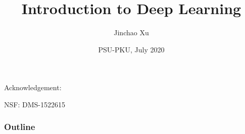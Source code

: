 \documentclass[handout]{beamer}
\begin{document}
\begin{CJK*}{UTF8}{gbsn}
\title[DNN-MG]
{Introduction to Deep Learning}

\author[Xu]{Jinchao Xu}


\date[PSU-PKU]{PSU-PKU, July 2020}

\begin{frame}
\titlepage
{\footnotesize
	\centerline{Acknowledgement: }
	\centerline{{\color{blue} NSF}: DMS-1522615}
}
\end{frame}

\begin{frame}
\frametitle{Outline} \tiny
\setcounter{tocdepth}{2}
\tableofcontents
\end{frame}




%

%

\end{CJK*}
\end{document}
